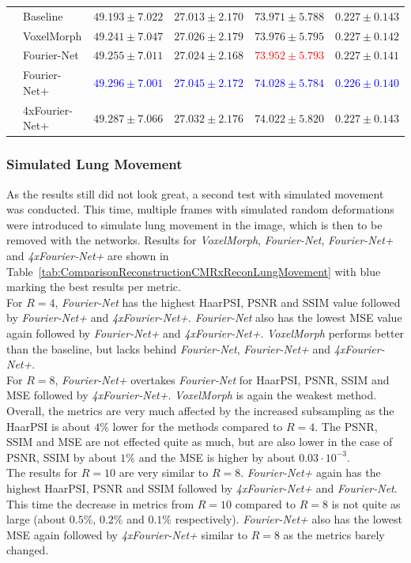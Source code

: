 \begin{table}[H]
\begin{tabularx}{\textwidth}{c Y Y Y Y Y}
		\midrule		
		 & Baseline & $49.193 \pm 7.022$ & $27.013 \pm 2.170$ & $73.971 \pm 5.788$ & $0.227 \pm 0.143$ \\  
		 & VoxelMorph & $49.241 \pm 7.047$ & $27.026 \pm 2.179$ & $73.976 \pm 5.795$ & $0.227 \pm 0.142$ \\  
		 & Fourier-Net & $49.255 \pm 7.011$ & $27.024 \pm 2.168$ & \textcolor{red}{$73.952 \pm 5.793$} & $0.227 \pm 0.141$ \\  
		 & Fourier-Net+ & \textcolor{blue}{$49.296 \pm 7.001$} & \textcolor{blue}{$27.045 \pm 2.172$} & \textcolor{blue}{$74.028 \pm 5.784$} & \textcolor{blue}{$0.226 \pm 0.140$} \\   
		 & \mbox{4xFourier-Net+} & $49.287 \pm 7.066$ & $27.032 \pm 2.176$ & $74.022 \pm 5.820$ & $0.227 \pm 0.143$ \\ 
		 \bottomrule
	\end{tabularx}
\end{table}


\subsubsection{Simulated Lung Movement}
As the results still did not look great, a second test with simulated movement was conducted. This time, multiple frames with simulated random deformations were introduced to simulate lung movement in the image, which is then to be removed with the networks. Results for  \emph{VoxelMorph}, \emph{Fourier-Net}, \emph{Fourier-Net+} and \emph{4xFourier-Net+} are shown in Table~\ref{tab:ComparisonReconstructionCMRxReconLungMovement} with blue marking the best results per metric.\\
For $R=4$, \emph{Fourier-Net} has the highest HaarPSI, PSNR and SSIM value followed by \emph{Fourier-Net+} and \emph{4xFourier-Net+}. \emph{Fourier-Net} also has the lowest MSE value again followed by \emph{Fourier-Net+} and \emph{4xFourier-Net+}. \emph{VoxelMorph} performs better than the baseline, but lacks behind \emph{Fourier-Net}, \emph{Fourier-Net+} and \emph{4xFourier-Net+}.\\
For $R=8$, \emph{Fourier-Net+} overtakes \emph{Fourier-Net} for HaarPSI, PSNR, SSIM and MSE followed by \emph{4xFourier-Net+}. \emph{VoxelMorph} is again the weakest method. Overall, the metrics are very much affected by the increased subsampling as the HaarPSI is about $4 \%$ lower for the methods compared to $R=4$. The PSNR, SSIM and MSE are not effected quite as much, but are also lower in the case of PSNR, SSIM by about $1 \%$ and the MSE is higher by about $0.03 \cdot 10^{-3}$.\\
The results for $R=10$ are very similar to $R=8$. \emph{Fourier-Net+} again has the highest HaarPSI, PSNR and SSIM followed by \emph{4xFourier-Net+} and \emph{Fourier-Net}. This time the decrease in metrics from $R=10$ compared to $R=8$ is not quite as large (about $0.5 \%$, $0.2 \%$ and $0.1 \%$ respectively). \emph{Fourier-Net+} also has the lowest MSE again followed by \emph{4xFourier-Net+} similar to $R=8$ as the metrics barely changed.

